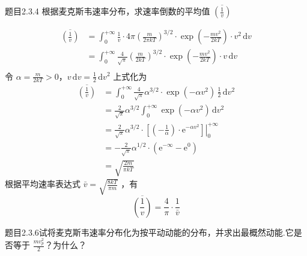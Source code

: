 \begin{question}{题目2.3.4}
    根据麦克斯韦速率分布，求速率倒数的平均值 $\overline{\left(\frac{1}{v}\right)}$
\end{question}

\begin{solution}
    $$
        \begin{aligned}
            \overline{\left(\frac{1}{v}\right)}
             & = \int_0^{+\infty} \frac{1}{v} \cdot 4\pi \left(\frac{m}{2\pi kT}\right)^{3/2} \cdot \exp\left(-\frac{mv^2}{2kT}\right) \cdot v^2 \,\mathrm{d}v \\
             & = \int_0^{+\infty} \frac{4}{\sqrt{\pi}}\left(\frac{m}{2kT}\right)^{3/2} \cdot \exp\left(-\frac{mv^2}{2kT}\right) \cdot v \,\mathrm{d}v          \\
        \end{aligned}
    $$
    令 $\alpha = \frac{m}{2kT}>0$，$v\,\mathrm{d}v = \frac{1}{2}\,\mathrm{d}v^2$ 上式化为
    $$
        \begin{aligned}
            \overline{\left(\frac{1}{v}\right)}
             & = \int_0^{+\infty} \frac{4}{\sqrt{\pi}} \alpha^{3/2} \cdot \exp(-\alpha v^2) \, \frac{1}{2}\,\mathrm{d}v^2                                     \\
             & = \frac{2}{\sqrt{\pi}}\alpha^{3/2} \int_0^{+\infty} \exp(-\alpha v^2) \,\mathrm{d}v^2                                                          \\
             & = \frac{2}{\sqrt{\pi}}\alpha^{3/2} \cdot \left.\left[\left(-\frac{1}{\alpha}\right) \cdot \mathrm{e}^{-\alpha v^2}\right]\right|_{0}^{+\infty} \\
             & = -\frac{2}{\sqrt{\pi}}\alpha^{1/2} \cdot (\mathrm{e}^{-\infty}-\mathrm{e}^0)                                                                  \\
             & = \sqrt{\frac{2m}{\pi kT}}
        \end{aligned}
    $$
    根据平均速率表达式 $\bar{v} = \sqrt{\frac{8kT}{\pi m}}$ ，有
    $$
        \overline{\left(\frac{1}{v}\right)} = \frac{4}{\pi} \cdot \frac{1}{\bar{v}}
    $$
\end{solution}

\begin{question}{题目2.3.6}试将麦克斯韦速率分布化为按平动动能的分布，并求出最概然动能.它是否等于 $\frac{mv_p^2}{2}$？为什么？
\end{question}

